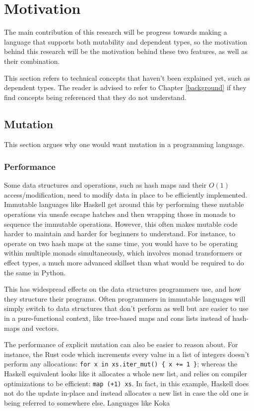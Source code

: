 \documentclass[12pt,twoside]{report}
\begin{document}
\section{Motivation}
The main contribution of this research will be progress towards making a language that supports both mutability and dependent types, so the motivation behind this research will be the motivation behind these two features, as well as their combination.

This section refers to technical concepts that haven't been explained yet, such as dependent types. The reader is advised to refer to Chapter \ref*{background} if they find concepts being referenced that they do not understand.

\subsection{Mutation}
This section argues why one would want mutation in a programming language.

\subsubsection{Performance}
Some data structures and operations, such as hash maps and their $O(1)$ access/modification, need to modify data in place to be efficiently implemented. Immutable languages like Haskell get around this by performing these mutable operations via unsafe escape hatches and then wrapping those in monads to sequence the immutable operations. However, this often makes mutable code harder to maintain and harder for beginners to understand. For instance, to operate on two hash maps at the same time, you would have to be operating within multiple monads simultaneously, which involves monad transformers or effect types, a much more advanced skillset than what would be required to do the same in Python.

This has widespread effects on the data structures programmers use, and how they structure their programs. Often programmers in immutable languages will simply switch to data structures that don't perform as well but are easier to use in a pure-functional context, like tree-based maps and cons lists instead of hash-maps and vectors.

The performance of explicit mutation can also be easier to reason about. For instance, the Rust code which increments every value in a list of integers doesn't perform any allocations: \verb|for x in xs.iter_mut() { x += 1 }|; whereas the Haskell equivalent looks like it allocates a whole new list, and relies on compiler optimizations to be efficient: \verb|map (+1) xs|. In fact, in this example, Haskell does not do the update in-place and instead allocates a new list in case the old one is being referred to somewhere else. Languages like Koka
\end{document}
